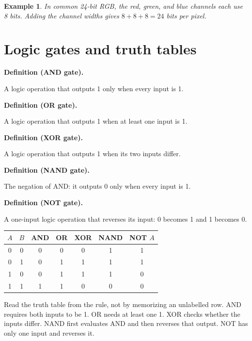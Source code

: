 \documentclass[11pt]{article}
\newtheorem{example}{Example}[section]
\newenvironment{definitionbox}[1]{%
  \par\noindent\textbf{Definition (#1).}\ \itshape
}{\par\vspace{0.3em}}
\begin{document}
\begin{example}
In common 24-bit RGB, the red, green, and blue channels each use 8 bits.
Adding the channel widths gives $8+8+8=24$ bits per pixel.
\end{example}

\section{Logic gates and truth tables}
\begin{definitionbox}{AND gate}
A logic operation that outputs 1 only when every input is 1.
\end{definitionbox}

\begin{definitionbox}{OR gate}
A logic operation that outputs 1 when at least one input is 1.
\end{definitionbox}

\begin{definitionbox}{XOR gate}
A logic operation that outputs 1 when its two inputs differ.
\end{definitionbox}

\begin{definitionbox}{NAND gate}
The negation of AND: it outputs 0 only when every input is 1.
\end{definitionbox}

\begin{definitionbox}{NOT gate}
A one-input logic operation that reverses its input: 0 becomes 1 and 1
becomes 0.
\end{definitionbox}

\begin{center}
\begin{tabular}{cc|cccc|c}
\toprule
$A$ & $B$ & AND & OR & XOR & NAND & NOT $A$\\
\midrule
0 & 0 & 0 & 0 & 0 & 1 & 1\\
0 & 1 & 0 & 1 & 1 & 1 & 1\\
1 & 0 & 0 & 1 & 1 & 1 & 0\\
1 & 1 & 1 & 1 & 0 & 0 & 0\\
\bottomrule
\end{tabular}
\end{center}

Read the truth table from the rule, not by memorizing an unlabelled row.
AND requires both inputs to be 1. OR needs at least one 1. XOR checks
whether the inputs differ. NAND first evaluates AND and then reverses that
output. NOT has only one input and reverses it.
\end{document}
